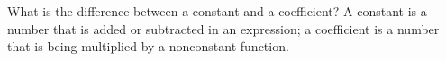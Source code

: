 {What is the difference between a constant and a coefficient?
}
{A constant is a number that is added or subtracted in an expression; a coefficient is a number that is being multiplied by a nonconstant function. 
}
